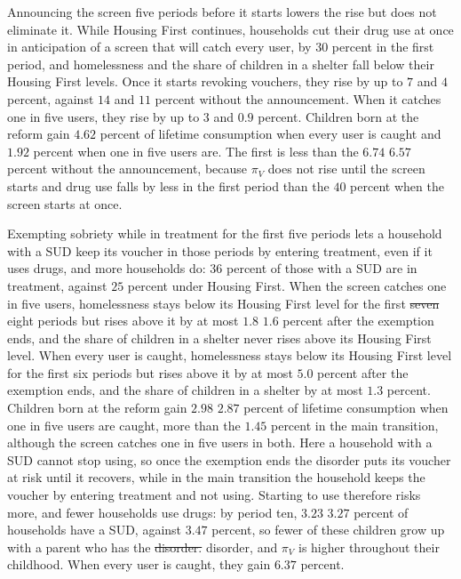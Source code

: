 \documentclass[10pt]{article}
\newcommand{\new}[1]{{\color{red}#1}}
\DeclareRobustCommand{\del}[1]{\sout{#1}}
\DeclareRobustCommand{\del}[1]{\sout{#1}}
\begin{document}
Announcing the screen five periods before it starts lowers the rise but does not eliminate it. While Housing First continues, households cut their drug use at once in anticipation of a screen that will catch every user, by $30$ percent in the first period, and homelessness and the share of children in a shelter fall below their Housing First levels. Once it starts revoking vouchers, they rise by up to $7$ and $4$ percent, against $14$ and $11$ percent without the announcement. When it catches one in five users, they rise by up to $3$ and $0.9$ percent. Children born at the reform gain $4.62$ percent of lifetime consumption when every user is caught and $1.92$ percent when one in five users are. The first is less than the \del{$6.74$} \new{$6.57$} percent without the announcement, because $\pi_V$ does not rise until the screen starts and drug use falls by less in the first period than the $40$ percent when the screen starts at once.

Exempting sobriety while in treatment for the first five periods lets a household with a SUD keep its voucher in those periods by entering treatment, even if it uses drugs, and more households do: $36$ percent of those with a SUD are in treatment, against $25$ percent under Housing First. When the screen catches one in five users, homelessness stays below its Housing First level for the first \del{seven} \new{eight} periods but rises above it by at most \del{$1.8$} \new{$1.6$} percent after the exemption ends, and the share of children in a shelter never rises above its Housing First level. When every user is caught, homelessness stays below its Housing First level for the first six periods but rises above it by at most $5.0$ percent after the exemption ends, and the share of children in a shelter by at most $1.3$ percent. Children born at the reform gain \del{$2.98$} \new{$2.87$} percent of lifetime consumption when one in five users are caught, more than the $1.45$ percent in the main transition, although the screen catches one in five users in both. Here a household with a SUD cannot stop using, so once the exemption ends the disorder puts its voucher at risk until it recovers, while in the main transition the household keeps the voucher by entering treatment and not using. Starting to use therefore risks more, and fewer households use drugs: by period ten, \del{$3.23$} \new{$3.27$} percent of households have a SUD, against $3.47$ percent, so fewer of these children grow up with a parent who has the \del{disorder.} \new{disorder, and $\pi_V$ is higher throughout their childhood.} When every user is caught, they gain $6.37$ percent.
\end{document}
